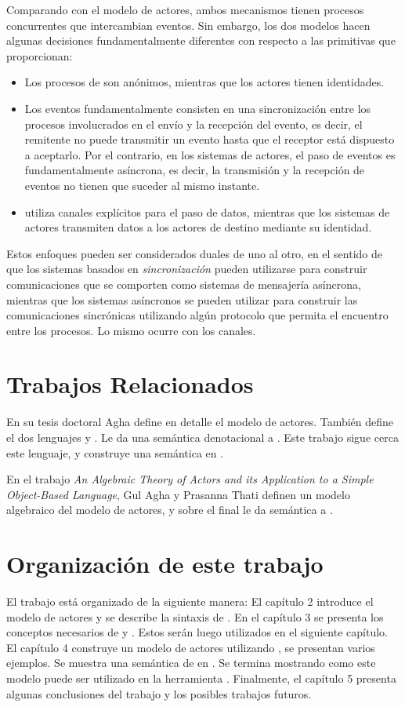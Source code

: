 Comparando \CSP con el modelo de actores, ambos mecanismos tienen procesos concurrentes que intercambian eventos. Sin embargo, los dos modelos hacen algunas decisiones fundamentalmente diferentes con respecto a las primitivas que proporcionan:

\begin{itemize}
\item Los procesos de \CSP son anónimos, mientras que los actores tienen identidades.
\item Los eventos fundamentalmente consisten en una sincronización entre los procesos involucrados en el envío y la recepción del evento, es decir, el remitente no puede transmitir un evento hasta que el receptor está dispuesto a aceptarlo. Por el contrario, en los sistemas de actores, el paso de eventos es fundamentalmente asíncrona, es decir, la transmisión y la recepción de eventos no tienen que suceder al mismo instante.
\item \CSP utiliza canales explícitos para el paso de datos, mientras que los sistemas de actores transmiten datos a los actores de destino mediante su identidad.
\end{itemize}

Estos enfoques pueden ser considerados duales de uno al otro, en el sentido de que los sistemas basados en \emph{sincronización} pueden utilizarse para construir comunicaciones que se comporten como sistemas de mensajería asíncrona, mientras que los sistemas asíncronos se pueden utilizar para construir las comunicaciones sincrónicas utilizando algún protocolo que permita el encuentro entre los procesos. Lo mismo ocurre con los canales.

\section{Trabajos Relacionados}

En su tesis doctoral Agha\cite{Agha:1986:AMC:7929} define en detalle el modelo de actores. También define el dos lenguajes \SAL y \ACT. Le da una semántica denotacional a \SAL. Este trabajo sigue cerca este lenguaje, y construye una semántica en \CSP.

En el trabajo \textit{An Algebraic Theory of Actors and its Application to a Simple Object-Based Language}\cite{apicalculus}, Gul Agha y Prasanna Thati definen un modelo algebraico del modelo de actores, y sobre el final le da semántica a \SAL.

\section{Organización de este trabajo}

El trabajo está organizado de la siguiente manera: El capítulo 2 introduce el modelo de actores y se describe la sintaxis de \SAL. En el capítulo 3 se presenta los conceptos necesarios de \CSP y \CSPm. Estos serán luego utilizados en el siguiente capítulo. El capítulo 4 construye un modelo de actores utilizando \CSP, se presentan varios ejemplos. Se muestra una semántica de \SAL en \CSP. Se termina mostrando como este modelo puede ser utilizado en la herramienta \FDR. Finalmente, el capítulo 5 presenta algunas conclusiones del trabajo y los posibles trabajos futuros.
